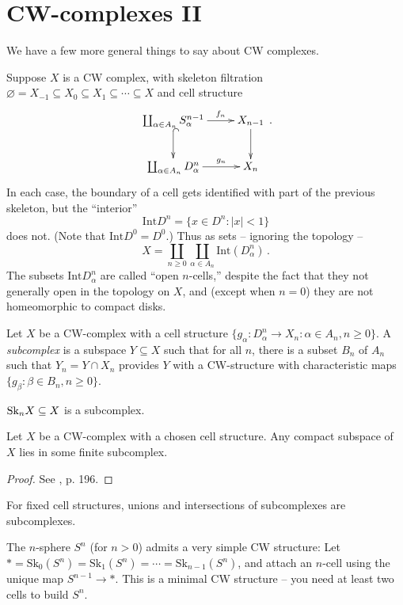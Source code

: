 \section{CW-complexes II}

We have a few more general things to say about CW complexes. 

Suppose $X$ is a CW complex, with skeleton filtration 
$\varnothing=X_{-1}\subseteq X_0\subseteq X_1\subseteq\cdots\subseteq X$ and 
cell structure
\begin{equation*}
\xymatrix{\coprod_{\alpha\in A_n}S^{n-1}_\alpha\ar[r]^-{f_n}\ar@{^(->}[d] & X_{n-1}\ar[d]\\
\coprod_{\alpha\in A_n}D^n_\alpha\ar[r]^-{g_n} & X_{n}}\,.
\end{equation*}
In each case, the boundary of a cell gets identified with part of the previous skeleton, but the ``interior''
\[
\mathrm{Int}D^n=\{x\in D^n:|x|<1\}
\]
does not. (Note that $\mathrm{Int}D^0=D^0$.) Thus as sets -- ignoring
the topology -- 
\[
X=\coprod_{n\geq 0}\coprod_{\alpha\in A_n}\mathrm{Int}(D^n_\alpha)\,.
\]
The subsets $\mathrm{Int}D^n_\alpha$ are called ``open $n$-cells,'' 
despite the fact that they not generally open in the topology on $X$,
and (except when $n=0$) they are not homeomorphic to compact disks.

\begin{definition}
Let $X$ be a CW-complex with a cell structure 
$\{g_\alpha:D^n_\alpha\to X_n:\alpha\in A_n,n\geq0\}$. A {\em subcomplex} is a subspace $Y\subseteq X$ such that for all $n$, there is a subset $B_n$ of $A_n$ such that $Y_n=Y\cap X_n$ provides $Y$ with a CW-structure with characteristic maps $\{g_\beta:\beta\in B_n,n\geq0\}$.
\end{definition}
\begin{example}
$\mathrm{Sk}_nX\subseteq X$ is a subcomplex.
\end{example}
\begin{prop}
Let $X$ be a CW-complex with a chosen cell structure. Any compact subspace
of $X$ lies in some finite subcomplex. 
\end{prop}
\begin{proof}
See \cite{bredon}, p. 196.
\end{proof}
\begin{remark}
For fixed cell structures, unions and intersections of subcomplexes are subcomplexes.
\end{remark}

The $n$-sphere $S^n$ (for $n>0$) 
admits a very simple CW structure:
Let $\ast=\mathrm{Sk}_0(S^n)=\mathrm{Sk}_1(S^n)=\cdots=\mathrm{Sk}_{n-1}(S^n)$,
and attach an $n$-cell using the unique map $S^{n-1}\to\ast$. This is a 
minimal CW structure -- you need at least two cells to build $S^n$. 


